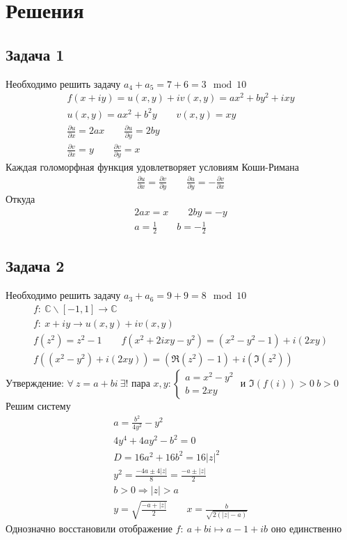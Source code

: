 
\newpage
\section*{Решения}
\subsection*{Задача 1}
	Необходимо решить задачу $a_4 + a_5 = 7 + 6 = 3 \mod 10$
	\begin{gather*}
		f(x + iy) = u(x,y) + iv(x,y) = ax^2 + by^2 + ixy\\
		u(x,y) = ax^2 + b^2y\qquad v(x,y) = xy\\
		\frac{\partial u}{\partial x} = 2ax\qquad \frac{\partial u}{\partial y} = 2by\\
		\frac{\partial v}{\partial x} = y\qquad \frac{\partial v}{\partial y} = x
	\end{gather*}
	Каждая голоморфная функция удовлетворяет условиям Коши-Римана
	\begin{gather*}
		\frac{\partial u}{\partial x} = \frac{\partial v}{\partial y}\qquad \frac{\partial u}{\partial y} = -\frac{\partial v}{\partial x}
	\end{gather*}
	Откуда
	\begin{gather*}
		2ax = x\qquad 2by = -y\\
		a = \frac{1}{2}\qquad b = -\frac{1}{2}
	\end{gather*}
\vskip 0.4in

\subsection*{Задача 2}
	Необходимо решить задачу $a_3 + a_6 = 9 + 9 = 8 \mod 10$
	\begin{gather*}
		f:\ \mathbb{C} \backslash [-1,1] \to \mathbb{C}\\
		f:\ x + iy \to u(x,y) + i v(x,y)\\
		f(z^2) = z^2 - 1\qquad f(x^2 + 2ixy - y^2) = (x^2 - y^2 - 1) + i(2xy)\\
		f((x^2 - y^2) + i(2xy)) = (\Re(z^2) - 1) + i(\Im(z^2))
	\end{gather*}
	Утверждение: $\forall\ z = a + bi\ \exists !$ пара $x,y: \begin{cases} a = x^2 - y^2\\ b = 2xy \end{cases}$ и $\Im(f(i)) > 0\ b > 0$
	\vskip 0.1in
	Решим систему
	\begin{gather*}
	a = \frac{b^2}{4y^2} - y^2\\
	4y^4 + 4ay^2 - b^2 = 0\\
	D = 16a^2 + 16b^2 = 16|z|^2\\
	y^2 = \frac{-4a \pm 4|z|}{8} = \frac{-a \pm |z|}{2}\\
	b > 0 \Rightarrow |z| > a\\
	y = \sqrt{\frac{-a+|z|}{2}}\qquad
	x = \frac{b}{\sqrt{2(|z| - a)}}
	\end{gather*}
	Однозначно восстановили отображение
	$f:\ a+bi \mapsto a-1 + ib$
	оно единственно
\vskip 0.4in

